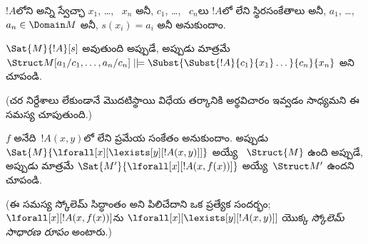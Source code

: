 \documentclass[../../../include/open-logic-section]{subfiles}
\begin{document}
\begin{prob}
\begin{enumerate}

\end{enumerate}
$!A$లోని అన్ని స్వేచ్ఛా  $x_1$, \dots, ~$x_n$ అనీ,
$c_1$, \dots, ~$c_n$లు $!A$లో లేని స్థిరసంకేతాలు అనీ,
$a_1$, \dots, ~$a_n \in \Domain M$ అనీ, $s(x_i) = a_i$ అనీ
అనుకుందాం.

$\Sat{M}{!A}[s]$ అవుతుంది అప్పుడే, అప్పుడు మాత్రమే
$\Struct M[a_1/c_1,\dots,a_n/c_n]
\VDash \Subst{\Subst{!A}{c_1}{x_1}\dots}{c_n}{x_n}$ అని చూపండి.

(చర నిర్దేశాలు లేకుండానే మొదటిస్థాయి విధేయ తర్కానికి అర్థవిచారం
ఇవ్వడం సాధ్యమని ఈ సమస్య చూపుతుంది.)
\end{prob}

\begin{prob}
$f$ అనేది~$!A(x,y)$లో లేని ప్రమేయ సంకేతం అనుకుందాం. అప్పుడు
$\Sat{M}{\lforall[x][\lexists[y][!A(x,y)]]}$ అయ్యే
~$\Struct{M}$ ఉంది అప్పుడే, అప్పుడు మాత్రమే
$\Sat{M'}{\lforall[x][!A(x,f(x))]}$ అయ్యే~$\Struct M'$ ఉందని చూపండి.

(ఈ సమస్య స్కోలెమ్ సిద్ధాంతం అని పిలిచేదాని ఒక ప్రత్యేక సందర్భం;
$\lforall[x][!A(x,f(x))]$ను
$\lforall[x][\lexists[y][!A(x,y)]]$ యొక్క \emph{స్కోలెమ్ సాధారణ రూపం}
అంటారు.)
\end{prob}
\end{document}
